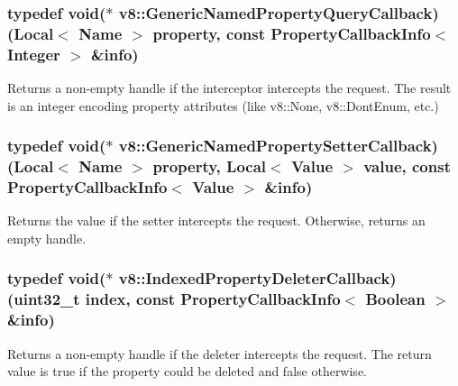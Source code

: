 \subsubsection[{\texorpdfstring{Generic\+Named\+Property\+Query\+Callback}{GenericNamedPropertyQueryCallback}}]{\setlength{\rightskip}{0pt plus 5cm}typedef void($\ast$ v8\+::\+Generic\+Named\+Property\+Query\+Callback) ({\bf Local}$<$ {\bf Name} $>$ property, const {\bf Property\+Callback\+Info}$<$ {\bf Integer} $>$ \&info)}\hypertarget{namespacev8_add9f7ab11e4a9a2b9ad2c4536b0e1a64}{}\label{namespacev8_add9f7ab11e4a9a2b9ad2c4536b0e1a64}
Returns a non-\/empty handle if the interceptor intercepts the request. The result is an integer encoding property attributes (like v8\+::\+None, v8\+::\+Dont\+Enum, etc.) 
\subsubsection[{\texorpdfstring{Generic\+Named\+Property\+Setter\+Callback}{GenericNamedPropertySetterCallback}}]{\setlength{\rightskip}{0pt plus 5cm}typedef void($\ast$ v8\+::\+Generic\+Named\+Property\+Setter\+Callback) ({\bf Local}$<$ {\bf Name} $>$ property, {\bf Local}$<$ {\bf Value} $>$ value, const {\bf Property\+Callback\+Info}$<$ {\bf Value} $>$ \&info)}\hypertarget{namespacev8_af74716c6e95a269c6cd4314662fd0a7e}{}\label{namespacev8_af74716c6e95a269c6cd4314662fd0a7e}
Returns the value if the setter intercepts the request. Otherwise, returns an empty handle. 
\subsubsection[{\texorpdfstring{Indexed\+Property\+Deleter\+Callback}{IndexedPropertyDeleterCallback}}]{\setlength{\rightskip}{0pt plus 5cm}typedef void($\ast$ v8\+::\+Indexed\+Property\+Deleter\+Callback) (uint32\+\_\+t index, const {\bf Property\+Callback\+Info}$<$ {\bf Boolean} $>$ \&info)}\hypertarget{namespacev8_a53863728de14cde48dd6543207b2f2da}{}\label{namespacev8_a53863728de14cde48dd6543207b2f2da}
Returns a non-\/empty handle if the deleter intercepts the request. The return value is true if the property could be deleted and false otherwise. 
